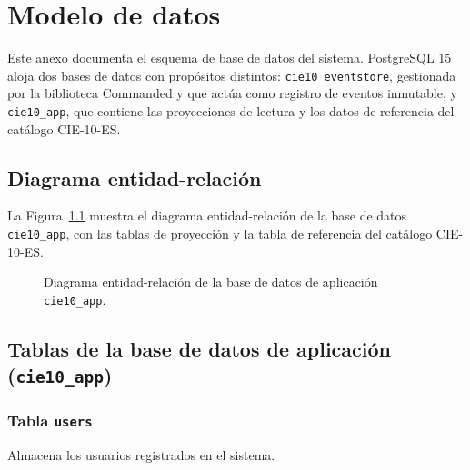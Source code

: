 \chapter{Modelo de datos}
\label{cap:AnexoD}

Este anexo documenta el esquema de base de datos del sistema. PostgreSQL 15 aloja dos bases de datos con propósitos distintos: \texttt{cie10\_eventstore}, gestionada por la biblioteca Commanded y que actúa como registro de eventos inmutable, y \texttt{cie10\_app}, que contiene las proyecciones de lectura y los datos de referencia del catálogo CIE-10-ES.

\section{Diagrama entidad-relación}

La Figura~\ref{fig:erd-bd} muestra el diagrama entidad-relación de la base de datos \texttt{cie10\_app}, con las tablas de proyección y la tabla de referencia del catálogo CIE-10-ES.

\begin{figure}[ht]
\centering
\resizebox{\textwidth}{!}{}
\caption{Diagrama entidad-relación de la base de datos de aplicación \texttt{cie10\_app}.}
\label{fig:erd-bd}
\end{figure}

\section{Tablas de la base de datos de aplicación (\texttt{cie10\_app})}

\subsection{Tabla \texttt{users}}

Almacena los usuarios registrados en el sistema.

